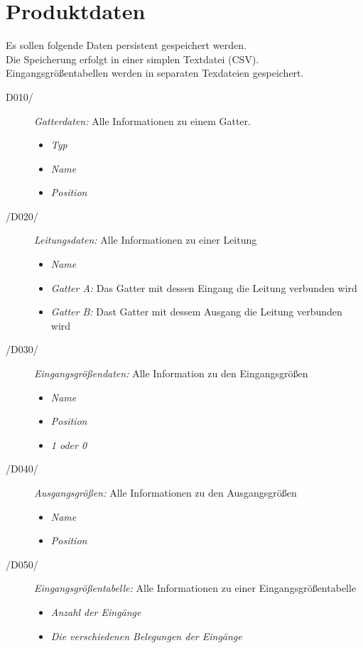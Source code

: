 
\section{Produktdaten}


Es sollen folgende Daten persistent gespeichert werden. \\
Die Speicherung erfolgt in einer simplen Textdatei (\gls{CSV}).\\
Eingangsgrößentabellen werden in separaten Texdateien gespeichert.
\begin{description}
	\item[D010/] \emph{Gatterdaten:} Alle Informationen zu einem Gatter.
	\begin{itemize}
		\item \emph{Typ}
		\item \emph{Name} 
		\item \emph{Position} 
	\end{itemize}
	
	\item[/D020/] \emph{Leitungsdaten:} Alle Informationen zu einer Leitung
	\begin{itemize}
		\item \emph{Name}
		\item \emph{Gatter A:} Das Gatter mit dessen Eingang die Leitung verbunden wird
		\item \emph{Gatter B:} Dast Gatter mit dessem Ausgang die Leitung verbunden wird
	\end{itemize}
	
	\item[/D030/] \emph{Eingangsgrößendaten:} Alle Information zu den Eingangsgrößen
	\begin{itemize}
		\item \emph{Name}
		\item \emph{Position}
		\item \emph{1 oder 0}
	\end{itemize}
	
	\item[/D040/] \emph{Ausgangsgrößen:} Alle Informationen zu den Ausgangsgrößen
	\begin{itemize}
		\item \emph{Name}
		\item \emph{Position}
	\end{itemize}
	
	\item[/D050/] \emph{Eingangsgrößentabelle:} Alle Informationen zu einer Eingangsgrößentabelle
	\begin{itemize}
		\item \emph{Anzahl der Eingänge}
		\item \emph{Die verschiedenen Belegungen der Eingänge}
	\end{itemize}
\end{description}